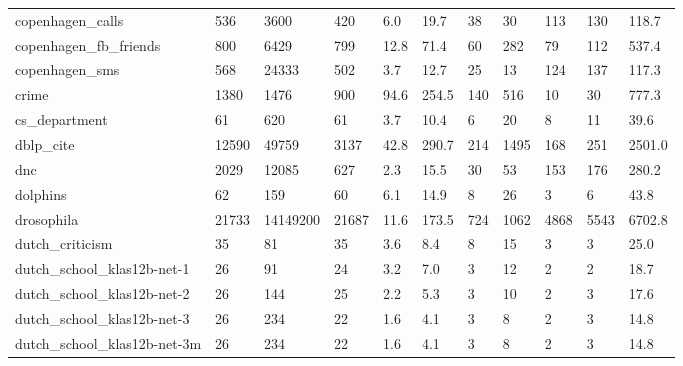 \begin{longtable}{lllllllllll}
 copenhagen\_calls                                   & 536        & 3600      & 420   & 6.0    & 19.7   & 38    & 30     & 113    & 130    & 118.7   \\
 copenhagen\_fb\_friends                              & 800        & 6429      & 799   & 12.8   & 71.4   & 60    & 282    & 79     & 112    & 537.4   \\
 copenhagen\_sms                                     & 568        & 24333     & 502   & 3.7    & 12.7   & 25    & 13     & 124    & 137    & 117.3   \\
 crime                                              & 1380       & 1476      & 900   & 94.6   & 254.5  & 140   & 516    & 10     & 30     & 777.3   \\
 cs\_department                                      & 61         & 620       & 61    & 3.7    & 10.4   & 6     & 20     & 8      & 11     & 39.6    \\
 dblp\_cite                                          & 12590      & 49759     & 3137  & 42.8   & 290.7  & 214   & 1495   & 168    & 251    & 2501.0  \\
 dnc                                                & 2029       & 12085     & 627   & 2.3    & 15.5   & 30    & 53     & 153    & 176    & 280.2   \\
 dolphins                                           & 62         & 159       & 60    & 6.1    & 14.9   & 8     & 26     & 3      & 6      & 43.8    \\
 drosophila                                         & 21733      & 14149200  & 21687 & 11.6   & 173.5  & 724   & 1062   & 4868   & 5543   & 6702.8  \\
 dutch\_criticism                                    & 35         & 81        & 35    & 3.6    & 8.4    & 8     & 15     & 3      & 3      & 25.0    \\
 dutch\_school\_klas12b-net-1                         & 26         & 91        & 24    & 3.2    & 7.0    & 3     & 12     & 2      & 2      & 18.7    \\
 dutch\_school\_klas12b-net-2                         & 26         & 144       & 25    & 2.2    & 5.3    & 3     & 10     & 2      & 3      & 17.6    \\
 dutch\_school\_klas12b-net-3                         & 26         & 234       & 22    & 1.6    & 4.1    & 3     & 8      & 2      & 3      & 14.8    \\
 dutch\_school\_klas12b-net-3m                        & 26         & 234       & 22    & 1.6    & 4.1    & 3     & 8      & 2      & 3      & 14.8    \\

\end{longtable}
